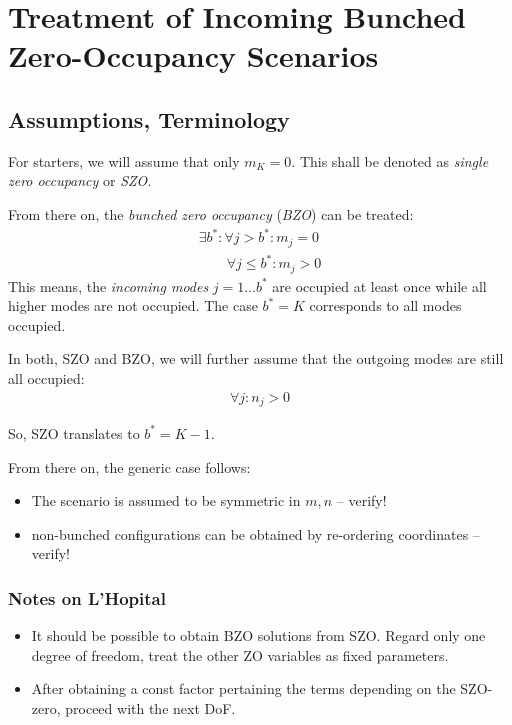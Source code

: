 \documentclass[
	english,
	a4paper,
	fontsize=10pt,
	parskip=half,
	titlepage=true,
	DIV=12,
	final
]{scrreprt}
\title{\myTitle}
\author{\myName}
\date{\today}
\begin{document}
\tableofcontents
\newpage

\chapter{Treatment of Incoming Bunched Zero-Occupancy Scenarios}
\section{Assumptions, Terminology}
For starters, we will assume that only $m_K = 0$. This shall be denoted as \emph{single zero occupancy} or \emph{SZO}.

From there on, the \emph{bunched zero occupancy} (\emph{BZO}) can be treated:
\begin{align}
	\exists b^{*} : \forall j > b^{*} : m_j = 0 \\
	\qquad \forall j \leq b^* : m_j > 0
\end{align}
This means, the \emph{incoming modes} $j = 1 \ldots b^{*}$ are occupied at least once while all higher modes are not occupied. The case $b^* = K$ corresponds to all modes occupied.

In both, SZO and BZO, we will further assume that the outgoing modes are still all occupied:
\begin{align}
	\forall j : n_j > 0
\end{align}

So, SZO translates to $b^* = K - 1$.

From there on, the generic case follows:
\begin{itemize}
\item The scenario is assumed to be symmetric in $m, n$ -- verify!
\item non-bunched configurations can be obtained by re-ordering coordinates -- verify!
\end{itemize}

\subsection{Notes on L'Hopital}
\begin{itemize}
\item It should be possible to obtain BZO solutions from SZO. Regard only one degree of freedom, treat the other ZO variables as fixed parameters.
\item After obtaining a const factor pertaining the terms depending on the SZO-zero, proceed with the next DoF.
\end{itemize}
\end{document}
